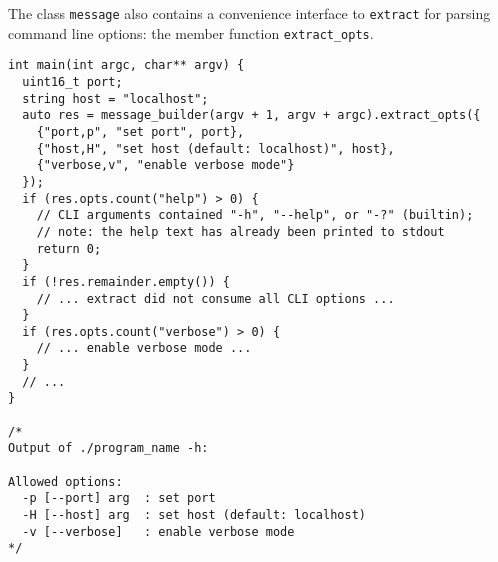 The class \lstinline^message^ also contains a convenience interface to \lstinline^extract^ for parsing command line options: the member function \lstinline^extract_opts^.

\begin{lstlisting}
int main(int argc, char** argv) {
  uint16_t port;
  string host = "localhost";
  auto res = message_builder(argv + 1, argv + argc).extract_opts({
    {"port,p", "set port", port},
    {"host,H", "set host (default: localhost)", host},
    {"verbose,v", "enable verbose mode"}
  });
  if (res.opts.count("help") > 0) {
    // CLI arguments contained "-h", "--help", or "-?" (builtin);
    // note: the help text has already been printed to stdout
    return 0;
  }
  if (!res.remainder.empty()) {
    // ... extract did not consume all CLI options ...
  }
  if (res.opts.count("verbose") > 0) {
    // ... enable verbose mode ...
  }
  // ...
}

/*
Output of ./program_name -h:

Allowed options:
  -p [--port] arg  : set port
  -H [--host] arg  : set host (default: localhost)
  -v [--verbose]   : enable verbose mode
*/
\end{lstlisting}
